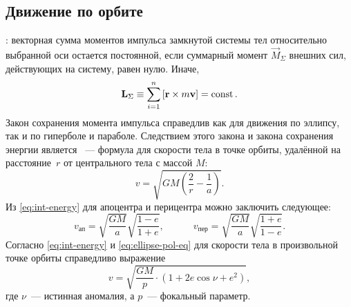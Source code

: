 \subsection{Движение по орбите}

:  векторная сумма моментов 
импульса замкнутой системы тел относительно выбранной оси остается 
постоянной, если суммарный момент $\vec{M}_\Sigma$ внешних сил, действующих на систему, равен нулю. Иначе,
\begin{equation}
\mathbf{L}_\Sigma \equiv \sum\limits_{i=1}^{n} \left[ \mathbf{r} \times m \mathbf{v} \right] = \operatorname{const}.
\end{equation}
Закон сохранения момента импульса справедлив как для движения по эллипсу, так и по гиперболе и параболе. Следствием этого закона и закона сохранения энергии является ~--- формула для скорости тела в точке орбиты, удалённой на расстояние~$r$ от центрального тела с массой $M$:
\begin{equation}
v = \sqrt{ GM \left( \frac{2}{r} - \frac{1}{a} \right)}.
\label{eq:int-energy}
\end{equation}
Из \eqref{eq:int-energy} для апоцентра и перицентра можно заключить следующее:
\begin{equation}v_{\text{ап}}=\sqrt{\frac{GM}{a}} \sqrt{\frac{1-e}{1+e}},
\quad\quad\quad v_{\text{пер}}=\sqrt{\frac{GM}{a}}\sqrt{\frac{1+e}{1-e}}.
\end{equation}
Согласно \eqref{eq:int-energy} и \eqref{eq:ellipse-pol-eq} для скорости тела в произвольной точке орбиты справедливо выражение
\begin{equation}
v = \sqrt{\frac{GM}{p}\cdot(1 + 2 e \cos \nu + e^2)},
\end{equation}
где $\nu$~--- истинная аномалия, а $p$~--- фокальный параметр.

